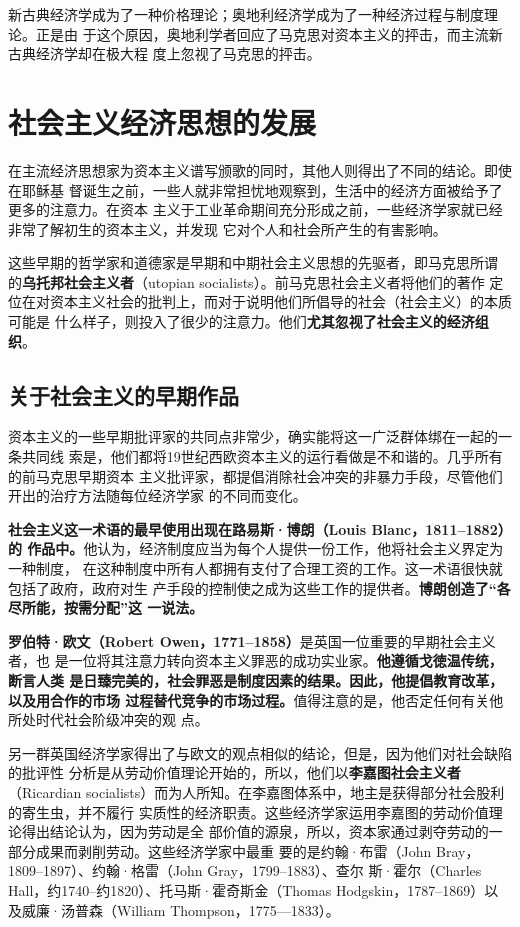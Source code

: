 新古典经济学成为了一种价格理论；奥地利经济学成为了一种经济过程与制度理论。正是由
于这个原因，奥地利学者回应了马克思对资本主义的抨击，而主流新古典经济学却在极大程
度上忽视了马克思的抨击。

\section{社会主义经济思想的发展}

在主流经济思想家为资本主义谱写颁歌的同时，其他人则得出了不同的结论。即使在耶稣基
督诞生之前，一些人就非常担忧地观察到，生活中的经济方面被给予了更多的注意力。在资本
主义于工业革命期间充分形成之前，一些经济学家就已经非常了解初生的资本主义，并发现
它对个人和社会所产生的有害影响。

这些早期的哲学家和道德家是早期和中期社会主义思想的先驱者，即马克思所谓
的\textbf{乌托邦社会主义者}（utopian socialists）。前马克思社会主义者将他们的著作
定位在对资本主义社会的批判上，而对于说明他们所倡导的社会（社会主义）的本质可能是
什么样子，则投入了很少的注意力。他们\textbf{尤其忽视了社会主义的经济组织}。

\subsection{关于社会主义的早期作品}

资本主义的一些早期批评家的共同点非常少，确实能将这一广泛群体绑在一起的一条共同线
索是，他们都将19世纪西欧资本主义的运行看做是不和谐的。几乎所有的前马克思早期资本
主义批评家，都提倡消除社会冲突的非暴力手段，尽管他们开出的治疗方法随每位经济学家
的不同而变化。

\textbf{社会主义这一术语的最早使用出现在路易斯·博朗（Louis Blanc，1811--1882）的
  作品中。}他认为，经济制度应当为每个人提供一份工作，他将社会主义界定为一种制度，
在这种制度中所有人都拥有支付了合理工资的工作。这一术语很快就包括了政府，政府对生
产手段的控制使之成为这些工作的提供者。\textbf{博朗创造了“各尽所能，按需分配”这
  一说法。}

\textbf{罗伯特·欧文（Robert Owen，1771--1858）}是英国一位重要的早期社会主义者，也
是一位将其注意力转向资本主义罪恶的成功实业家。\textbf{他遵循戈徳温传统，断言人类
  是日臻完美的，社会罪恶是制度因素的结果。因此，他提倡教育改革，以及用合作的市场
  过程替代竞争的市场过程。}值得注意的是，他否定任何有关他所处时代社会阶级冲突的观
点。

另一群英国经济学家得出了与欧文的观点相似的结论，但是，因为他们对社会缺陷的批评性
分析是从劳动价值理论开始的，所以，他们以\textbf{李嘉图社会主义者}（Ricardian
socialists）而为人所知。在李嘉图体系中，地主是获得部分社会股利的寄生虫，并不履行
实质性的经济职责。这些经济学家运用李嘉图的劳动价值理论得出结论认为，因为劳动是全
部价值的源泉，所以，资本家通过剥夺劳动的一部分成果而剥削劳动。这些经济学家中最重
要的是约翰·布雷（John Bray，1809--1897）、约翰·格雷（John Gray，1799--1883）、查尔
斯·霍尔（Charles Hall，约1740--约1820）、托马斯·霍奇斯金（Thomas
Hodgskin，1787--1869）以及威廉·汤普森（William Thompson，1775—1833）。

